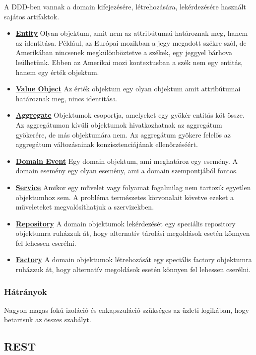 A DDD-ben vannak a domain kifejezésére, létrehozására, lekérdezésére használt sajátos artifaktok.

\begin{itemize}
    \item \textbf{\underline{Entity}}
    Olyan objektum, amit nem az attribútumai határoznak meg, hanem az identitása.
    Például, az Európai mozikban a jegy megadott székre szól, de Amerikában nincsenek megkülönböztetve a székek, egy jeggyel bárhova leülhetünk.
    Ebben az Amerikai mozi kontextusban a szék nem egy entitás, hanem egy érték objektum.
    \item \textbf{\underline{Value Object}}
    Az érték objektum egy olyan objektum amit attribútumai határoznak meg, nincs identitása.
    \item \textbf{\underline{Aggregate}}
    Objektumok csoportja, amelyeket egy gyökér entitás köt össze.
    Az aggregátumon kívüli objektumok hivatkozhatnak az aggregátum gyökerére, de más objektumára nem.
    Az aggregátum gyökere felelős az aggregátum változásainak konzisztenciájának ellenőrzéséért.
    \item \textbf{\underline{Domain Event}}
    Egy domain objektum, ami meghatároz egy esemény.
    A domain esemény egy olyan esemény, ami a domain szempontjából fontos.
    \item \textbf{\underline{Service}}
    Amikor egy művelet vagy folyamat fogalmilag nem tartozik egyetlen objektumhoz sem.
    A probléma természetes körvonalait követve ezeket a műveleteket megvalósíthatjuk a szervizekben.
    \item \textbf{\underline{Repository}}
    A domain objektumok lekérdezését egy speciális repository objektumra ruházzuk át, hogy alternatív tárolási megoldások esetén könnyen fel lehessen cserélni.
    \item \textbf{\underline{Factory}}
    A domain objektumok létrehozását egy speciális factory objektumra ruházzuk át, hogy alternatív megoldások esetén könnyen fel lehessen cserélni.
\end{itemize}

\subsubsection{Hátrányok}
Nagyon magas fokú izoláció és enkapszuláció szükséges az üzleti logikában, hogy betartsuk az összes szabályt.


\subsection{REST}\label{subsec:rest-architektúra}

